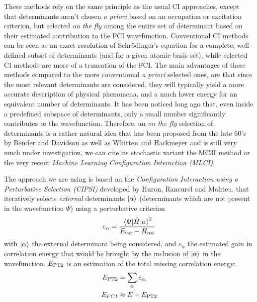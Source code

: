 \documentclass[./thesis.tex]{subfiles}
\begin{document}
These methods rely on the same principle as the usual CI approaches, except that determinants aren't chosen \textit{a priori} based on an occupation or excitation criterion, but selected \emph{on the fly} among the entire set of determinant based on their estimated contribution to the FCI wavefunction. Conventional CI methods can be seen as an exact resolution of Schrödinger's equation for a complete, well-defined subset of determinants (and for a given atomic basis set), while selected CI methods are more of a truncation of the FCI.
The main advantages of these methods compared to the more conventional \textit{a priori} selected ones, are that since the most relevant determinants are considered, they will typically yield a more accurate description of physical phenomena, and a much lower energy for an equivalent number of determinants.
It has been noticed long ago that, even inside a predefined subspace of determinants, only a small number significantly contributes to the wavefunction.\cite{Bytautas_2009,Anderson_2018} Therefore, an \emph{on the fly} selection of determinants is a rather natural idea that has been proposed from the late 60's by Bender and Davidson\cite{Bender_1969} as well as Whitten and Hackmeyer\cite{Whitten_1969} and is still very much under investigation, we can cite its stochastic variant the MC3I method\cite{Ohtsuka_2017} or the very recent \emph{Machine Learning Configuration Interaction (MLCI)}.\cite{1808.05787}

The approach we are using is based on the \emph{Configuration Interaction using a Perturbative Selection (CIPSI)} developed by Huron, Rancurel and Malrieu,\cite{Huron_1973} that iteratively selects \emph{external} determinants ${\ket{\alpha}}$ (determinants which are not present in the wavefunction $\Psi$) using a perturbative criterion
\begin{equation}
e_\alpha = \frac{\mel{\Psi}{\hat{H}}{\alpha}^2}{E_\text{var} - H_{\alpha \alpha}}
\end{equation}
with $\ket \alpha$ the external determinant being considered, and $e_\alpha$ the estimated gain in correlation energy that would be brought by the inclusion of $\ket \alpha$ in the wavefunction. $E_\text{PT2}$ is an estimation of the total missing correlation energy:
\begin{align}
E_\text{PT2} & = \sum_{\alpha} e_\alpha \\
E_{FCI} & \approx E + E_\text{PT2}
\end{align}
\end{document}
